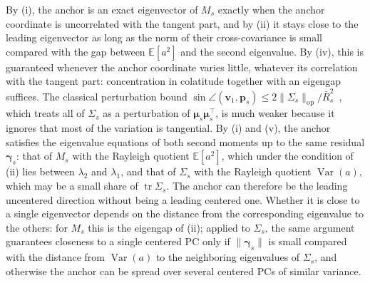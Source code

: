 \documentclass[10pt,letterpaper]{article}
\newcommand{\E}{\mathbb{E}}
\newcommand{\Rbar}{\bar{R}}
\newcommand{\anchor}{\bm{p}}
\begin{document}
By (i), the anchor is an exact eigenvector of $M_s$ exactly when the anchor coordinate is
uncorrelated with the tangent part, and by (ii) it stays close to the leading eigenvector as
long as the norm of their cross-covariance is small compared with the gap between $\E[a^{2}]$
and the second eigenvalue. By (iv), this is guaranteed whenever the anchor coordinate varies
little, whatever its correlation with the tangent part: concentration in colatitude together
with an eigengap suffices. The classical perturbation bound
$\sin\angle(\bm{v}_1,\anchor_s)\leq2\lVert\Sigma_s\rVert_{\mathrm{op}}/\Rbar_s^{2}$~\cite{davis1970rotation,yu2015daviskahan}, which treats all of $\Sigma_s$ as a perturbation of
$\bm{\mu}_s\bm{\mu}_s^{\top}$, is much weaker because it ignores that most of the variation is
tangential. By (i) and (v), the anchor satisfies the eigenvalue equations of both second moments
up to the same residual $\bm{\gamma}_s$: that of $M_s$ with the Rayleigh quotient $\E[a^{2}]$,
which under the condition of (ii) lies between $\lambda_2$ and $\lambda_1$, and that of $\Sigma_s$
with the Rayleigh quotient $\operatorname{Var}(a)$, which may be a small share of
$\operatorname{tr}\Sigma_s$. The anchor can therefore be the leading uncentered
direction without being a leading centered one. Whether it is close to a single eigenvector depends
on the distance from the corresponding eigenvalue to the others: for $M_s$ this is the eigengap of
(ii); applied to $\Sigma_s$, the same argument guarantees closeness to a single centered PC only if
$\lVert\bm{\gamma}_s\rVert$ is small compared with the distance from $\operatorname{Var}(a)$ to the
neighboring eigenvalues of $\Sigma_s$, and otherwise the anchor can be spread over several
centered PCs of similar variance.
\end{document}
